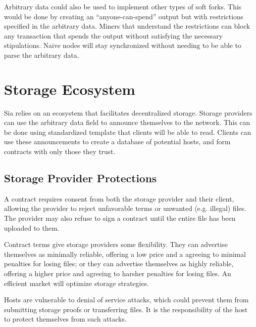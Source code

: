 \documentclass[twocolumn]{article}
\begin{document}
Arbitrary data could also be used to implement other types of soft forks.
This would be done by creating an ``anyone-can-spend'' output but with restrictions specified in the arbitrary data.
Miners that understand the restrictions can block any transaction that spends the output without satisfying the necessary stipulations.
Naive nodes will stay synchronized without needing to be able to parse the arbitrary data.

\section{Storage Ecosystem}
Sia relies on an ecosystem that facilitates decentralized storage.
Storage providers can use the arbitrary data field to announce themselves to the network.
This can be done using standardized template that clients will be able to read.
Clients can use these announcements to create a database of potential hosts, and form contracts with only those they trust.

\subsection{Storage Provider Protections}
A contract requires consent from both the storage provider and their client, allowing the provider to reject unfavorable terms or unwanted (e.g. illegal) files.
The provider may also refuse to sign a contract until the entire file has been uploaded to them.

Contract terms give storage providers some flexibility.
They can advertise themselves as minimally reliable, offering a low price and a agreeing to minimal penalties for losing files;
or they can advertise themselves as highly reliable, offering a higher price and agreeing to harsher penalties for losing files.
An efficient market will optimize storage strategies.

Hosts are vulnerable to denial of service attacks, which could prevent them from submitting storage proofs or transferring files.
It is the responsibility of the host to protect themselves from such attacks.
\end{document}

